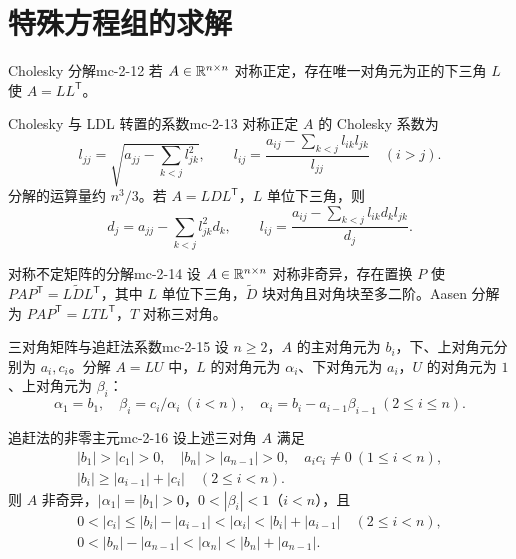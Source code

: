 \section{特殊方程组的求解}

\begin{theorem}{Cholesky 分解}{mc-2-12}
若 $A\in\mathbb{R}^{n\times n}$ 对称正定，存在唯一对角元为正的下三角 $L$ 使 $A=LL^{\mathsf T}$。
\end{theorem}

\begin{proposition}{Cholesky 与 LDL 转置的系数}{mc-2-13}
对称正定 $A$ 的 Cholesky 系数为
\[
l_{jj}=\sqrt{a_{jj}-\sum_{k<j}l_{jk}^2},\qquad
l_{ij}=\frac{a_{ij}-\sum_{k<j}l_{ik}l_{jk}}{l_{jj}}\quad(i>j).
\]
分解的运算量约 $n^3/3$。若 $A=LDL^{\mathsf T}$，$L$ 单位下三角，则
\[d_j=a_{jj}-\sum_{k<j}l_{jk}^2d_k,\qquad l_{ij}=\frac{a_{ij}-\sum_{k<j}l_{ik}d_kl_{jk}}{d_j}.\]
\end{proposition}

\begin{proposition}{对称不定矩阵的分解}{mc-2-14}
设 $A\in\mathbb{R}^{n\times n}$ 对称非奇异，存在置换 $P$ 使 $PAP^{\mathsf T}=L\widetilde D L^{\mathsf T}$，其中 $L$ 单位下三角，$\widetilde D$ 块对角且对角块至多二阶。Aasen 分解为 $PAP^{\mathsf T}=LTL^{\mathsf T}$，$T$ 对称三对角。
\end{proposition}

\begin{definition}{三对角矩阵与追赶法系数}{mc-2-15}
设 $n\geq2$，$A$ 的主对角元为 $b_i$，下、上对角元分别为 $a_i,c_i$。分解 $A=LU$ 中，$L$ 的对角元为 $\alpha_i$、下对角元为 $a_i$，$U$ 的对角元为 $1$、上对角元为 $\beta_i$：
\[\alpha_1=b_1,\quad\beta_i=c_i/\alpha_i\ (i<n),\quad\alpha_i=b_i-a_{i-1}\beta_{i-1}\ (2\leq i\leq n).\]
\end{definition}

\begin{theorem}{追赶法的非零主元}{mc-2-16}
设上述三对角 $A$ 满足
\[
\begin{gathered}
|b_1|>|c_1|>0,\quad|b_n|>|a_{n-1}|>0,\quad a_ic_i\ne0\ (1\leq i<n),\\
|b_i|\geq|a_{i-1}|+|c_i|\quad(2\leq i<n).
\end{gathered}
\]
则 $A$ 非奇异，$|\alpha_1|=|b_1|>0$，$0<|\beta_i|<1$（$i<n$），且
\[
\begin{gathered}
0<|c_i|\leq|b_i|-|a_{i-1}|<|\alpha_i|<|b_i|+|a_{i-1}|\quad(2\leq i<n),\\
0<|b_n|-|a_{n-1}|<|\alpha_n|<|b_n|+|a_{n-1}|.
\end{gathered}
\]
\end{theorem}

